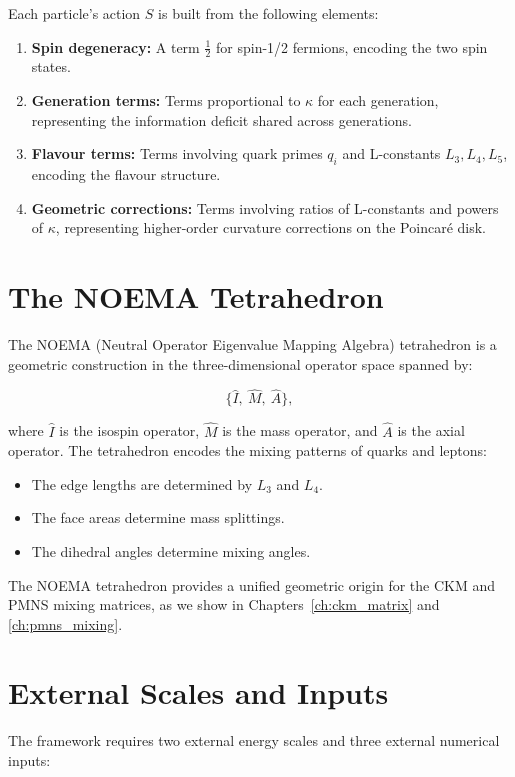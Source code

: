 Each particle's action \(S\) is built from the following elements:

\begin{enumerate}
\item \textbf{Spin degeneracy:} A term \(\frac{1}{2}\) for spin-1/2 fermions,
encoding the two spin states.
\item \textbf{Generation terms:} Terms proportional to \(\kappa\) for each
generation, representing the information deficit shared across generations.
\item \textbf{Flavour terms:} Terms involving quark primes \(q_i\) and
L-constants \(L_3, L_4, L_5\), encoding the flavour structure.
\item \textbf{Geometric corrections:} Terms involving ratios of L-constants
and powers of \(\kappa\), representing higher-order curvature corrections on
the Poincar\'{e} disk.
\end{enumerate}

\section{The NOEMA Tetrahedron}

The NOEMA (Neutral Operator Eigenvalue Mapping Algebra) tetrahedron is a
geometric construction in the three-dimensional operator space spanned by:

\[
\{\hat I,\ \hat M,\ \hat A\},
\]

where \(\hat I\) is the isospin operator, \(\hat M\) is the mass operator,
and \(\hat A\) is the axial operator.  The tetrahedron encodes the mixing
patterns of quarks and leptons:

\begin{itemize}
\item The edge lengths are determined by \(L_3\) and \(L_4\).
\item The face areas determine mass splittings.
\item The dihedral angles determine mixing angles.
\end{itemize}

The NOEMA tetrahedron provides a unified geometric origin for the CKM and
PMNS mixing matrices, as we show in Chapters~\ref{ch:ckm_matrix} and
\ref{ch:pmns_mixing}.

\section{External Scales and Inputs}

The framework requires two external energy scales and three external numerical
inputs:

